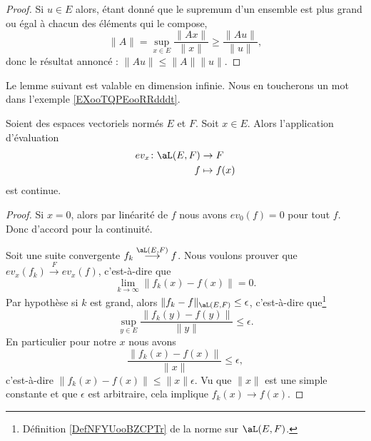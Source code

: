 \begin{proof}
    Si \( u\in E\) alors, étant donné que le supremum d'un ensemble est plus grand ou égal à chacun des éléments qui le compose,
    \begin{equation}
        \| A \|=\sup_{x\in E}\frac{ \| Ax \| }{ \| x \| }\geq \frac{ \| Au \| }{ \| u \| },
    \end{equation}
    donc le résultat annoncé : \( \| Au \|\leq \| A \|\| u \|\).
\end{proof}

Le lemme suivant est valable en dimension infinie. Nous en toucherons un mot dans l'exemple \ref{EXooTQPEooRRdddt}.
\begin{lemma}       \label{LEMooWFNXooLyTyyX}
    Soient des espaces vectoriels normés \( E\) et \( F\). Soit \( x\in E\). Alors l'application d'évaluation
    \begin{equation}
        \begin{aligned}
            ev_x\colon \aL(E,F) & \to F \\
                        f       & \mapsto f(x)
        \end{aligned}
    \end{equation}
    est continue.
\end{lemma}

\begin{proof}
    Si \( x=0\), alors par linéarité de \( f\) nous avons \( ev_0(f)=0\) pour tout \( f\). Donc d'accord pour la continuité.

    Soit une suite convergente \( f_k\stackrel{\aL(E,F)}{\longrightarrow}f\). Nous voulons prouver que \( ev_x(f_k)\stackrel{F}{\longrightarrow}ev_x(f)\), c'est-à-dire que
    \begin{equation}
        \lim_{k\to \infty} \| f_k(x)-f(x) \|=0.
    \end{equation}
    Par hypothèse si \( k\) est grand, alors \( \| f_k-f  \|_{\aL(E,F)}\leq \epsilon\), c'est-à-dire que\footnote{Définition \ref{DefNFYUooBZCPTr} de la norme sur \( \aL(E,F)\).}
    \begin{equation}
        \sup_{y\in E}\frac{ \| f_k(y)-f(y) \| }{ \| y \| }\leq \epsilon.
    \end{equation}
    En particulier pour notre \( x\) nous avons
    \begin{equation}
        \frac{ \| f_k(x)-f(x) \| }{ \| x \| }\leq \epsilon,
    \end{equation}
    c'est-à-dire \( \| f_k(x)-f(x) \|\leq \| x \|\epsilon\). Vu que \( \| x \|\) est une simple constante et que \( \epsilon\) est arbitraire, cela implique \( f_k(x)\to f(x)\).
\end{proof}


